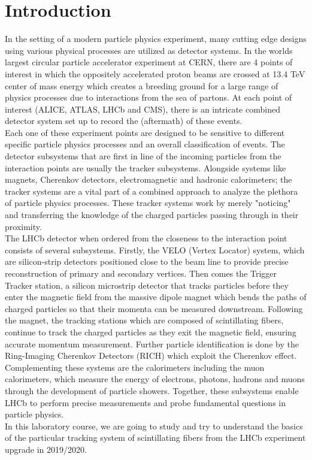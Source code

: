 \chapter*{Introduction}

In the setting of a modern particle physics experiment, many cutting edge designs using various physical processes are utilized as detector systems. In the worlds largest circular particle accelerator experiment at CERN, there are 4 points of interest in which the oppositely accelerated proton beams are crossed at 13.4 TeV center of mass energy which creates a breeding ground for a large range of physics processes due to interactions from the sea of partons. At each point of interest (ALICE, ATLAS, LHCb and CMS), there is an intricate combined detector system set up to record the (aftermath) of these events.\\

Each one of these experiment points are designed to be sensitive to different specific particle physics processes and an overall classification of events. The detector subsystems that are first in line of the incoming particles from the interaction points are usually the tracker subsystems. Alongside systems like magnets, Cherenkov detectors, electromagnetic and hadronic calorimeters; the tracker systems are a vital part of a combined approach to analyze the plethora of particle physics processes. These tracker systems work by merely "noticing" and transferring the knowledge of the charged particles passing through in their proximity.\\

The LHCb detector when ordered from the closeness to the interaction point consists of several subsystems. Firstly, the VELO (Vertex Locator) system, which are silicon-strip detectors positioned close to the beam line to provide precise reconstruction of primary and secondary vertices. Then comes the Trigger Tracker station, a silicon microstrip detector that tracks particles before they enter the magnetic field from the massive dipole magnet which bends the paths of charged particles so that their momenta can be measured downstream. Following the magnet, the tracking stations which are composed of scintillating fibers, continue to track the charged particles as they exit the magnetic field, ensuring accurate momentum measurement. Further particle identification is done by the Ring-Imaging Cherenkov Detectors (RICH) which exploit the Cherenkov effect. Complementing these systems are the calorimeters including the muon calorimeters, which measure the energy of electrons, photons, hadrons and muons through the development of particle showers. Together, these subsystems enable LHCb to perform precise measurements and probe fundamental questions in particle physics.\cite{LHCb_detector}\\

In this laboratory course, we are going to study and try to understand the basics of the particular tracking system of scintillating fibers from the LHCb experiment upgrade in 2019/2020. 